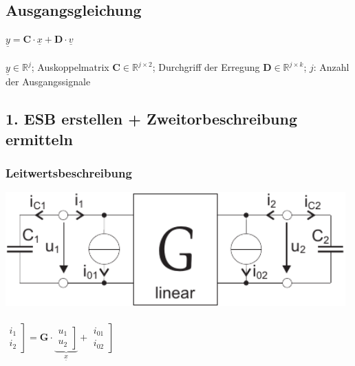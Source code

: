 \documentclass[a4paper,twocolumn,10pt]{article}
\begin{document}
\subsection*{Ausgangsgleichung}
$\underline{y}=\textbf{C}\cdot \underline{x}+\textbf{D}\cdot \underline{v}$\\\\
$\underline{y}\in \mathbb{R}^{j}$; Auskoppelmatrix $\textbf{C}\in \mathbb{R}^{j\times 2}$; Durchgriff der Erregung $\textbf{D}\in \mathbb{R}^{j\times k}$; $j$: Anzahl der Ausgangssignale
\subsection*{1. ESB erstellen + Zweitorbeschreibung ermitteln}
\begin{minipage}[t]{0.23\textwidth}
\subsubsection*{Leitwertsbeschreibung}
\includegraphics[width=0.98\textwidth]{Grafiken/ESBzweitenGrades1}\\\\
$\left.\begin{matrix}i_1 \\ i_2\end{matrix}\right]=\textbf{G}\cdot \underbrace{\left.\begin{matrix}u_1 \\ u_2\end{matrix}\right]}_{\underline{x}}+\left.\begin{matrix}i_{01} \\ i_{02}\end{matrix}\right]$
\end{minipage}
\hfill
\end{document}
